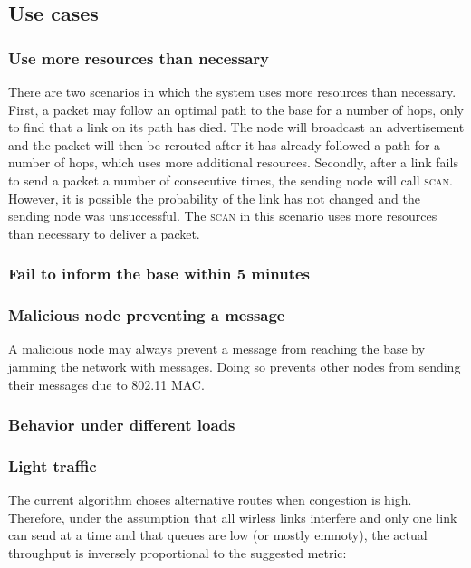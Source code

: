 \documentclass[letterpaper]{article}
\begin{document}
\subsection{Use cases}

\subsubsection{Use more resources than necessary}

There are two scenarios in which the system uses more resources than necessary. First, a packet may follow an optimal path
to the base for a number of hops, only to find that a link on its path has died. The node will broadcast an advertisement
and the packet will then be rerouted after it has already followed a path for a number of hops, which uses more additional
resources. Secondly, after a link fails to send a packet a number of consecutive times, the sending node will call
\textsc{scan}. However, it is possible the probability of the link has not changed and the sending node was unsuccessful.
The \textsc{scan} in this scenario uses more resources than necessary to deliver a packet.

\subsubsection{Fail to inform the base within 5 minutes}




\subsubsection{Malicious node preventing a message}

A malicious node may always prevent a message from reaching the base by jamming the network with messages. Doing so prevents
other nodes from sending their messages due to 802.11 MAC.

\subsubsection{Behavior under different loads}

\subsubsection{Light traffic}

The current algorithm choses alternative routes when congestion is high. Therefore, under the assumption that all wirless links interfere and only one link can send at a time and that queues are low (or mostly emmoty), the actual throughput is inversely proportional to the suggested metric:
\end{document}
